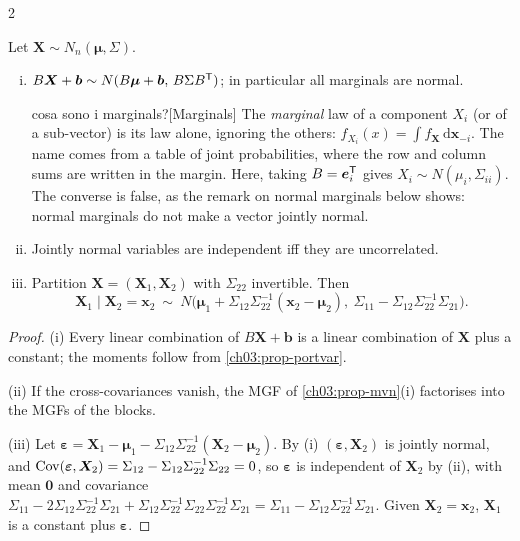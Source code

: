 \begin{paracol}{2}
\begin{theorem}\label{ch03:thm-mvn}
Let $\bm X\sim N_n(\bm\mu,\Sigma)$.
\begin{enumerate}[(i)]
  \item $B\bm X+\bm b\sim N(B\bm\mu+\bm b,\,B\Sigma B^{\mathsf T})$; in particular all marginals are normal.\begin{answer}{cosa sono i marginals?}[Marginals]
The \emph{marginal} law of a component $X_i$ (or of a sub-vector) is its law alone, ignoring the others:
$f_{X_i}(x)=\int f_{\bm X}\,\mathrm d\bm x_{-i}$. The name comes from a table of joint probabilities, where the row and column
sums are written in the margin. Here, taking $B=\bm e_i^{\mathsf T}$ gives $X_i\sim N(\mu_i,\Sigma_{ii})$. The converse is false, as the
remark on normal marginals below shows: normal marginals do not make a vector jointly normal.
\end{answer}
  \item Jointly normal variables are independent iff they are uncorrelated.
  \item Partition $\bm X=(\bm X_1,\bm X_2)$ with $\Sigma_{22}$ invertible. Then
        \[
          \bm X_1\mid\bm X_2=\bm x_2\ \sim\ N\bigl(\bm\mu_1+\Sigma_{12}\Sigma_{22}^{-1}(\bm x_2-\bm\mu_2),\ \Sigma_{11}-\Sigma_{12}\Sigma_{22}^{-1}\Sigma_{21}\bigr).
        \]
\end{enumerate}
\end{theorem}
\begin{proof}
(i) Every linear combination of $B\bm X+\bm b$ is a linear combination of $\bm X$ plus a constant; the moments follow from
\cref{ch03:prop-portvar}.

(ii) If the cross-covariances vanish, the MGF of \cref{ch03:prop-mvn}(i) factorises into the MGFs
of the blocks.

(iii) Let $\bm\varepsilon=\bm X_1-\bm\mu_1-\Sigma_{12}\Sigma_{22}^{-1}(\bm X_2-\bm\mu_2)$. By (i) $(\bm\varepsilon,\bm X_2)$ is
jointly normal, and $\operatorname{Cov}(\bm\varepsilon,\bm X_2)=\Sigma_{12}-\Sigma_{12}\Sigma_{22}^{-1}\Sigma_{22}=0$, so $\bm\varepsilon$ is independent of
$\bm X_2$ by (ii), with mean $\bm0$ and covariance $\Sigma_{11}-2\Sigma_{12}\Sigma_{22}^{-1}\Sigma_{21}+\Sigma_{12}\Sigma_{22}^{-1}\Sigma_{22}\Sigma_{22}^{-1}\Sigma_{21}
=\Sigma_{11}-\Sigma_{12}\Sigma_{22}^{-1}\Sigma_{21}$. Given $\bm X_2=\bm x_2$, $\bm X_1$ is a constant plus $\bm\varepsilon$.
\end{proof}


\end{paracol}
